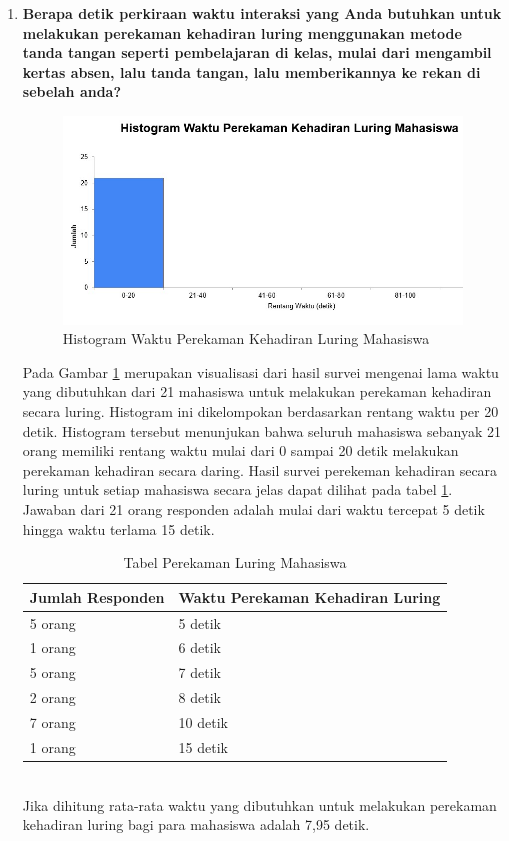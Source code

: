 \begin{enumerate}
	\item \textbf{Berapa detik perkiraan waktu interaksi yang Anda butuhkan untuk melakukan perekaman kehadiran luring menggunakan metode tanda tangan seperti pembelajaran di kelas, mulai dari mengambil kertas absen, lalu tanda tangan, lalu memberikannya ke rekan di sebelah anda?}
	\begin{figure}[H]
		\centering
		\includegraphics[scale=0.7]{Gambar/LuringMahasiswa.jpg}
		\caption{Histogram Waktu Perekaman Kehadiran Luring Mahasiswa} 
		\label{fig:LuringMahasiswa}
	\end{figure}
	Pada Gambar \ref{fig:LuringMahasiswa} merupakan visualisasi dari hasil survei mengenai lama waktu yang dibutuhkan dari 21 mahasiswa untuk melakukan perekaman kehadiran secara luring. Histogram ini dikelompokan berdasarkan rentang waktu per 20 detik. Histogram tersebut menunjukan bahwa seluruh mahasiswa sebanyak 21 orang memiliki rentang waktu mulai dari 0 sampai 20 detik melakukan perekaman kehadiran secara daring. Hasil survei perekeman kehadiran secara luring untuk setiap mahasiswa secara jelas dapat dilihat pada tabel \ref{tab:luringMahasiswa}. Jawaban dari 21 orang responden adalah mulai dari waktu tercepat 5 detik hingga waktu terlama 15 detik.
	\begin{table}[ht]			
		\caption{Tabel Perekaman Luring Mahasiswa}
		\centering
		\begin{tabular}{|p{4cm} |p{7cm}|}\hline
			Jumlah Responden &  Waktu Perekaman Kehadiran Luring \\ \hline     
			5 orang &  5 detik\\ \hline 
			1 orang &  6 detik\\ \hline 
			5 orang &  7 detik\\ \hline 
			2 orang &  8 detik\\ \hline 
			7 orang &  10 detik\\ \hline 
			1 orang &  15 detik\\ \hline
		\end{tabular}
		\label{tab:luringMahasiswa}
	\end{table}\\ 
	Jika dihitung rata-rata waktu yang dibutuhkan untuk melakukan perekaman kehadiran luring bagi para mahasiswa adalah 7,95 detik. 
\end{enumerate}
